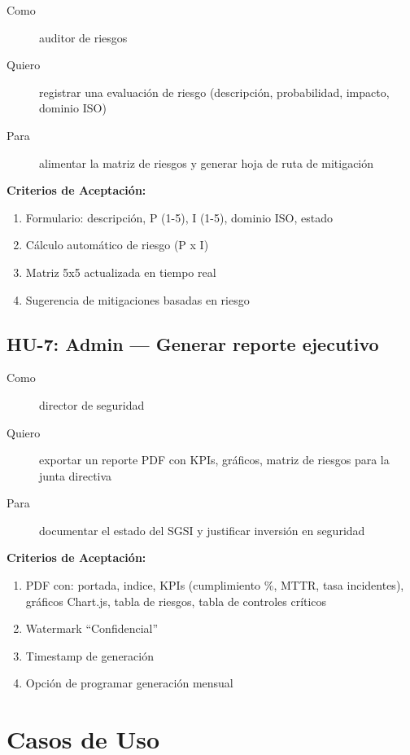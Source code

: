 \documentclass[12pt,a4paper,oneside]{article}
\begin{document}
\begin{description}
  \item[Como] auditor de riesgos
  \item[Quiero] registrar una evaluación de riesgo (descripción, probabilidad, impacto, dominio ISO)
  \item[Para] alimentar la matriz de riesgos y generar hoja de ruta de mitigación
\end{description}

\textbf{Criterios de Aceptación:}
\begin{enumerate}
  \item Formulario: descripción, P (1-5), I (1-5), dominio ISO, estado
  \item Cálculo automático de riesgo (P x I)
  \item Matriz 5x5 actualizada en tiempo real
  \item Sugerencia de mitigaciones basadas en riesgo
\end{enumerate}

\subsection{HU-7: Admin --- Generar reporte ejecutivo}

\begin{description}
  \item[Como] director de seguridad
  \item[Quiero] exportar un reporte PDF con KPIs, gráficos, matriz de riesgos para la junta directiva
  \item[Para] documentar el estado del SGSI y justificar inversión en seguridad
\end{description}

\textbf{Criterios de Aceptación:}
\begin{enumerate}
  \item PDF con: portada, indice, KPIs (cumplimiento \%, MTTR, tasa incidentes), gráficos Chart.js, tabla de riesgos, tabla de controles críticos
  \item Watermark ``Confidencial''
  \item Timestamp de generación
  \item Opción de programar generación mensual
\end{enumerate}

\section{Casos de Uso}
\end{document}
